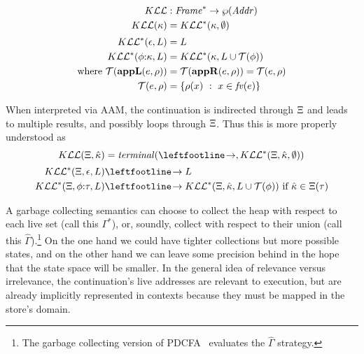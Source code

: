 \begin{align*}
  K{\mathcal L}{\mathcal L} &: \mathit{Frame}^* \to \wp(\mathit{Addr}) \\
  K{\mathcal L}{\mathcal L}(\kappa) &= K{\mathcal L}{\mathcal L}^*(\kappa,\emptyset) \\[2pt]
  K{\mathcal L}{\mathcal L}^*(\epsilon,L) &= L \\
  K{\mathcal L}{\mathcal L}^*(\phi{\tt :} \kappa, L) &= K{\mathcal L}{\mathcal L}^*(\kappa, L\cup{\mathcal T}(\phi)) \\
  \text{where } {\mathcal T}(\mathbf{appL}(e,\rho)) &= {\mathcal T}(\mathbf{appR}(e,\rho)) = {\mathcal T}(e,\rho) \\
                {\mathcal T}(e,\rho) &= \{ \rho(x)\ :\ x \in \mathit{fv}(e)\}
\end{align*}

When interpreted via AAM, the continuation is indirected through $\Xi$ and leads to multiple results, and possibly loops through $\Xi$.
%
Thus this is more properly understood as
\begin{align*}
  \kontlive(\mktab,\makont) &= \terminal(\stepto, \kontliveaux(\mktab,\makont,\emptyset)) \\[2pt]
  \kontliveaux(\mktab,\epsilon,L) &\stepto L \\
  \kontliveaux(\mktab,\kcons{\mkframe}{\mctx}, L) &\stepto \kontliveaux(\mktab,\makont, L\cup\touches(\mkframe)) \text{ if } \makont \in \mktab(\mctx)
\end{align*}
%

A garbage collecting semantics can choose to collect the heap with respect to each live set (call this $\Gamma^*$), or, soundly, collect with respect to their union (call this $\hat\Gamma$).\footnote{The garbage collecting version of PDCFA~\citep{ianjohnson:DBLP:journals/jfp/JohnsonSEMH14} evaluates the $\hat\Gamma$ strategy.}
%
On the one hand we could have tighter collections but more possible states, and on the other hand we can leave some precision behind in the hope that the state space will be smaller.
%
In the general idea of relevance versus irrelevance, the continuation's live addresses are relevant to execution, but are already implicitly represented in contexts because they must be mapped in the store's domain.

